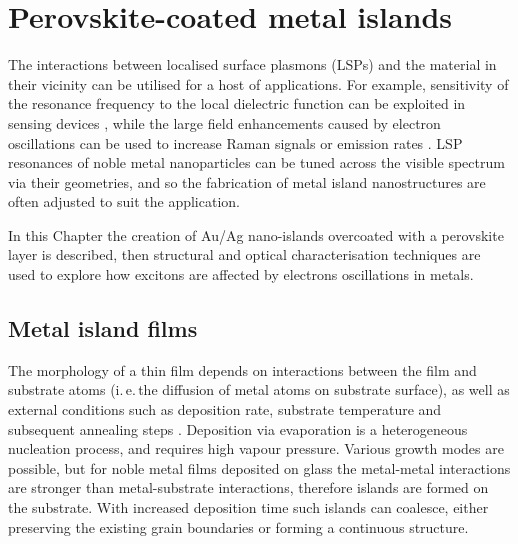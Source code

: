 
\chapter{Perovskite-coated metal islands}

\graphicspath{{Chapter6/Figures/}}

The interactions between localised surface plasmons (LSPs) and the material in their vicinity can be utilised for a host of applications. For example, sensitivity of the resonance frequency to the local dielectric function can be exploited in sensing devices \cite{Jensen2000, Xu2004, Malinsky2001, Royer1987}, while the large field enhancements caused by electron oscillations can be used to increase Raman signals \cite{Cade2009, Olson2001, Talley2005} or emission rates \cite{Toftegaard2011, Cho2010, Reboud2013, Blanco2004}. LSP resonances of noble metal nanoparticles can be tuned across the visible spectrum via their geometries, and so the fabrication of metal island nanostructures are often adjusted to suit the application.

In this Chapter the creation of Au/Ag nano-islands overcoated with a perovskite layer is described, then structural and optical characterisation techniques are used to explore how excitons are affected by electrons oscillations in metals.

\section{Metal island films}
The morphology of a thin film depends on interactions between the film and substrate atoms (i.\,e.\,the diffusion of metal atoms on substrate surface), as well as external conditions such as deposition rate, substrate temperature and subsequent annealing steps \cite{Kaiser2002}. Deposition via evaporation is a heterogeneous nucleation process, and requires high vapour pressure. Various growth modes are possible, but for noble metal films deposited on glass the metal-metal interactions are stronger than metal-substrate interactions, therefore islands are formed on the substrate. With increased deposition time such islands can coalesce, either preserving the existing grain boundaries or forming a continuous structure.

